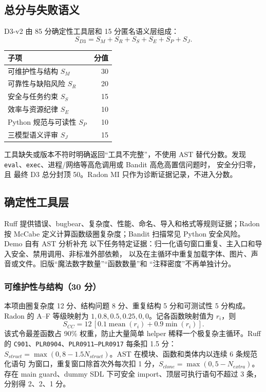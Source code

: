 \documentclass[UTF8,zihao=-4,fontset=fandol]{ctexart}
\begin{document}
\subsection{总分与失败语义}

D3-v2 由 85 分确定性工具层和 15 分匿名语义层组成：
\[
S_{D3}=S_M+S_R+S_S+S_E+S_P+S_J.
\]

\begin{center}
\begin{tabular}{lr}
\toprule
子项 & 分值\\
\midrule
可维护性与结构 $S_M$ & 30\\
可靠性与缺陷风险 $S_R$ & 20\\
安全与任务约束 $S_S$ & 15\\
效率与资源纪律 $S_E$ & 10\\
Python 规范与可读性 $S_P$ & 10\\
三模型语义评审 $S_J$ & 15\\
\bottomrule
\end{tabular}
\end{center}

工具缺失或版本不符时明确返回“工具不完整”，不使用 AST 替代分数。发现
\texttt{eval}、\texttt{exec}、进程/网络等高危调用或 Bandit 高危高置信问题时，
安全分归零，且
最终 D3 总分封顶 50。Radon MI 只作为诊断证据记录，不进入分数。

\subsection{确定性工具层}

Ruff 提供错误、bugbear、复杂度、性能、命名、导入和格式等规则证据；Radon 按 McCabe
定义计算函数级圈复杂度；Bandit 扫描常见 Python 安全风险。Demo 自有 AST 分析补充
以下任务特定证据：归一化语句窗口重复、主入口和导入安全、禁用调用、非标准外部依赖，
以及在主循环中重复加载字体、图片、声音或文件。旧版“魔法数字数量”“函数数量”和
“注释密度”不再单独计分。

\subsubsection{可维护性与结构（30 分）}

本项由圈复杂度 12 分、结构问题 8 分、重复结构 5 分和可测试性 5 分构成。Radon 的
A--F 等级映射为 $1,0.8,0.5,0.25,0,0$。记各函数映射值为 $r_i$，则
\[
S_{CC}=12\,[0.1\operatorname{mean}(r_i)+0.9\min(r_i)].
\]
该式令最差函数占 90\% 权重，防止大量简单 helper 稀释一个极复杂主循环。Ruff 的
\texttt{C901}、\texttt{PLR0904}、\texttt{PLR0911--PLR0917} 每条扣 1.5 分：
$S_{struct}=\max(0,8-1.5N_{struct})$。AST 在模块、函数和类体内以连续 6 条规范化语句
为窗口，重复窗口除首次外每次扣 1 分，$S_{clone}=\max(0,5-N_{extra})$。存在 main
guard、dummy SDL 下可安全 import、顶层可执行语句不超过 3 条，分别得 2、2、1 分。
\end{document}
